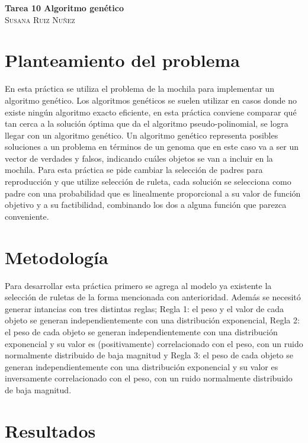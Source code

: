 \documentclass{article}
\begin{document}
	\begin{center}
	\huge{\textbf{Tarea 10 Algoritmo genético}}\\
	
	\textsc{ \Large Susana Ruiz Nuñez}
	\end{center}


\section{Planteamiento del problema} 
En esta práctica \cite{satu} se utiliza el problema de la mochila para implementar un algoritmo genético. Los algoritmos genéticos se suelen utilizar en casos donde no existe ningún algoritmo exacto eficiente, en esta práctica conviene comparar qué tan cerca a la solución óptima que da el algoritmo pseudo-polinomial, se logra llegar con un algoritmo genético. Un algoritmo genético representa posibles soluciones a un problema en términos de un genoma que en este caso va a ser un vector de verdades y falsos, indicando cuáles objetos se van a incluir en la mochila. Para esta práctica se pide cambiar la selección de padres para reproducción y que utilize selección de ruleta, cada solución se selecciona como padre con una probabilidad que es linealmente proporcional a su valor de función objetivo y a su factibilidad, combinando los dos a alguna función que parezca conveniente.

\section{Metodología}
Para desarrollar esta práctica primero se agrega al modelo ya existente \cite{satu} la selección de ruletas de la forma mencionada con anterioridad. Además se necesitó generar intancias con tres distintas reglas; Regla 1: el peso y el valor de cada objeto se generan independientemente con una distribución exponencial,
Regla 2: el peso de cada objeto se generan independientemente con una distribución exponencial y su valor es (positivamente) correlacionado con el peso, con un ruido normalmente distribuido de baja magnitud y
Regla 3: el peso de cada objeto se generan independientemente con una distribución exponencial y su valor es inversamente correlacionado con el peso, con un ruido normalmente distribuido de baja magnitud. 


\section{Resultados}
\end{document}
